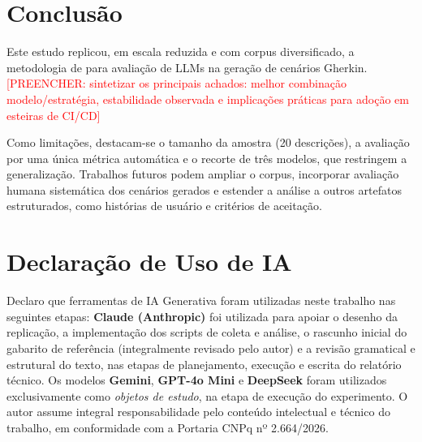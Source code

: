 \documentclass[12pt]{article}
\newcommand{\preencher}[1]{\textcolor{red}{[PREENCHER: #1]}}
\begin{document}
\section{Conclusão}

Este estudo replicou, em escala reduzida e com corpus diversificado, a metodologia de \cite{fernandes2025} para avaliação de LLMs na geração de cenários Gherkin. \preencher{sintetizar os principais achados: melhor combinação modelo/estratégia, estabilidade observada e implicações práticas para adoção em esteiras de CI/CD}

Como limitações, destacam-se o tamanho da amostra (20 descrições), a avaliação por uma única métrica automática e o recorte de três modelos, que restringem a generalização. Trabalhos futuros podem ampliar o corpus, incorporar avaliação humana sistemática dos cenários gerados e estender a análise a outros artefatos estruturados, como histórias de usuário e critérios de aceitação.

\section*{Declaração de Uso de IA}

Declaro que ferramentas de IA Generativa foram utilizadas neste trabalho nas seguintes etapas: \textbf{Claude (Anthropic)} foi utilizada para apoiar o desenho da replicação, a implementação dos scripts de coleta e análise, o rascunho inicial do gabarito de referência (integralmente revisado pelo autor) e a revisão gramatical e estrutural do texto, nas etapas de planejamento, execução e escrita do relatório técnico. Os modelos \textbf{Gemini}, \textbf{GPT-4o Mini} e \textbf{DeepSeek} foram utilizados exclusivamente como \emph{objetos de estudo}, na etapa de execução do experimento. O autor assume integral responsabilidade pelo conteúdo intelectual e técnico do trabalho, em conformidade com a Portaria CNPq nº 2.664/2026.



\end{document}
